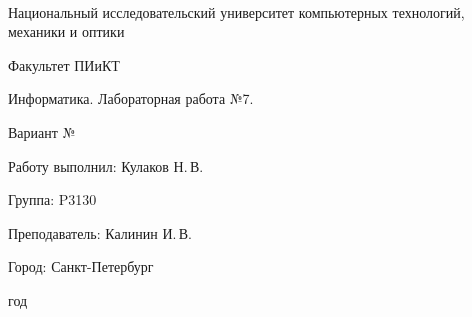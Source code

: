 \thispagestyle{empty}

\onecolumn
\begin{center}
	\
\vspace{2 cm}

\huge Национальный исследовательский университет компьютерных технологий, механики и оптики
\vspace{0.5cm}

\Huge Факультет ПИиКТ


\vspace{3cm}
\huge Информатика. Лабораторная работа №7.
\vspace{0.2cm}

\LARGE Вариант №
\end{center}
\vspace{4 cm}

\begin{flushright}
\Large

	Работу выполнил: Кулаков Н.\,В.
	\smallskip
	
	Группа: P3130
	\smallskip
	
	Преподаватель: Калинин И.\,В.
	\smallskip
	
	Город: Санкт-Петербург
	\vspace{2cm}
	
 год
\end{flushright}

